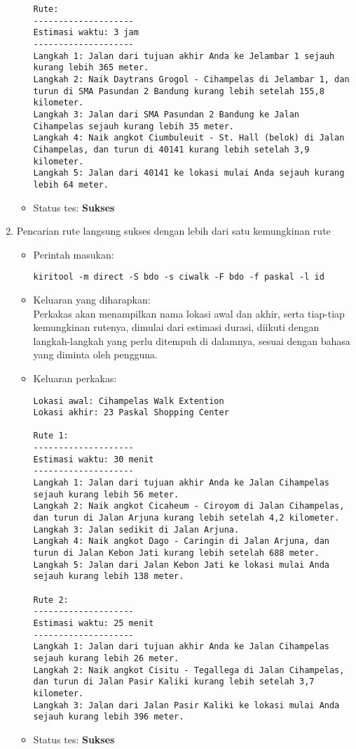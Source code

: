 \begin{enumerate}
\begin{itemize}
\begin{lstlisting}
Rute:
--------------------
Estimasi waktu: 3 jam 
--------------------
Langkah 1: Jalan dari tujuan akhir Anda ke Jelambar 1 sejauh kurang lebih 365 meter.
Langkah 2: Naik Daytrans Grogol - Cihampelas di Jelambar 1, dan turun di SMA Pasundan 2 Bandung kurang lebih setelah 155,8 kilometer.
Langkah 3: Jalan dari SMA Pasundan 2 Bandung ke Jalan Cihampelas sejauh kurang lebih 35 meter.
Langkah 4: Naik angkot Ciumbuleuit - St. Hall (belok) di Jalan Cihampelas, dan turun di 40141 kurang lebih setelah 3,9 kilometer.
Langkah 5: Jalan dari 40141 ke lokasi mulai Anda sejauh kurang lebih 64 meter.
		\end{lstlisting}
		\item Status tes: \textbf{Sukses}
	\end{itemize}
	
	\item Pencarian rute langsung sukses dengan lebih dari satu kemungkinan rute
	\begin{itemize}
		\item Perintah masukan:
		\begin{verbatim}
kiritool -m direct -S bdo -s ciwalk -F bdo -f paskal -l id
		\end{verbatim}
		\item Keluaran yang diharapkan: \\
		Perkakas akan menampilkan nama lokasi awal dan akhir, serta tiap-tiap kemungkinan rutenya, dimulai dari estimasi durasi, diikuti dengan langkah-langkah yang perlu ditempuh di dalamnya, sesuai dengan bahasa yang diminta oleh pengguna.
		\item Keluaran perkakas:
		\begin{lstlisting}
Lokasi awal: Cihampelas Walk Extention
Lokasi akhir: 23 Paskal Shopping Center

Rute 1:
--------------------
Estimasi waktu: 30 menit 
--------------------
Langkah 1: Jalan dari tujuan akhir Anda ke Jalan Cihampelas sejauh kurang lebih 56 meter.
Langkah 2: Naik angkot Cicaheum - Ciroyom di Jalan Cihampelas, dan turun di Jalan Arjuna kurang lebih setelah 4,2 kilometer.
Langkah 3: Jalan sedikit di Jalan Arjuna.
Langkah 4: Naik angkot Dago - Caringin di Jalan Arjuna, dan turun di Jalan Kebon Jati kurang lebih setelah 688 meter.
Langkah 5: Jalan dari Jalan Kebon Jati ke lokasi mulai Anda sejauh kurang lebih 138 meter.

Rute 2:
--------------------
Estimasi waktu: 25 menit 
--------------------
Langkah 1: Jalan dari tujuan akhir Anda ke Jalan Cihampelas sejauh kurang lebih 26 meter.
Langkah 2: Naik angkot Cisitu - Tegallega di Jalan Cihampelas, dan turun di Jalan Pasir Kaliki kurang lebih setelah 3,7 kilometer.
Langkah 3: Jalan dari Jalan Pasir Kaliki ke lokasi mulai Anda sejauh kurang lebih 396 meter.
		\end{lstlisting}
		\item Status tes: \textbf{Sukses}
	\end{itemize}
	

\end{enumerate}
